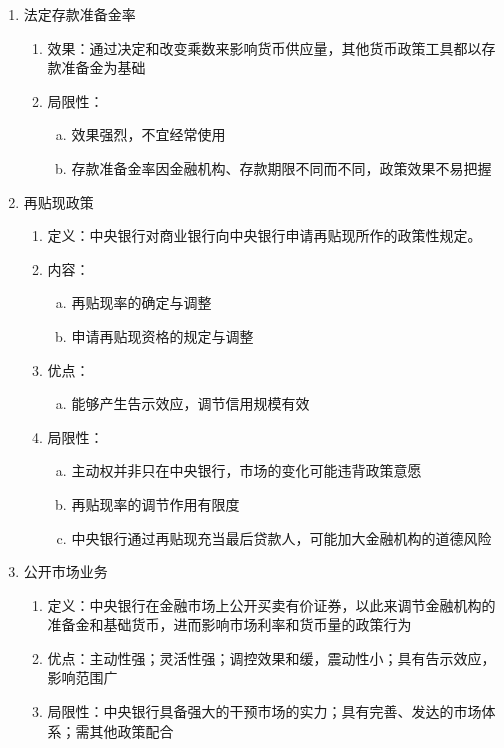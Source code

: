 \documentclass[12pt]{book}
\begin{document}
\begin{enumerate}[1.]
  \item 法定存款准备金率
        \begin{enumerate}[(1)]
          \item 效果：通过决定和改变乘数来影响货币供应量，其他货币政策工具都以存款准备金为基础
          \item 局限性：
                \begin{enumerate}[a.]
                  \item 效果强烈，不宜经常使用
                  \item 存款准备金率因金融机构、存款期限不同而不同，政策效果不易把握
                \end{enumerate}
        \end{enumerate}
  \item 再贴现政策
        \begin{enumerate}[(1)]
          \item  定义：中央银行对商业银行向中央银行申请再贴现所作的政策性规定。
          \item 内容：
                \begin{enumerate}[a.]
                  \item 再贴现率的确定与调整
                  \item 申请再贴现资格的规定与调整
                \end{enumerate}
          \item 优点：
                \begin{enumerate}[a.]
                  \item 能够产生告示效应，调节信用规模有效
                \end{enumerate}
          \item 局限性：
                \begin{enumerate}[a.]
                  \item 主动权并非只在中央银行，市场的变化可能违背政策意愿
                  \item 再贴现率的调节作用有限度
                  \item 中央银行通过再贴现充当最后贷款人，可能加大金融机构的道德风险
                \end{enumerate}
        \end{enumerate}
  \item 公开市场业务
        \begin{enumerate}[(1)]
          \item 定义：中央银行在金融市场上公开买卖有价证券，以此来调节金融机构的准备金和基础货币，进而影响市场利率和货币量的政策行为
          \item 优点：主动性强；灵活性强；调控效果和缓，震动性小；具有告示效应，影响范围广
          \item 局限性：中央银行具备强大的干预市场的实力；具有完善、发达的市场体系；需其他政策配合
        \end{enumerate}
\end{enumerate}
\end{document}
